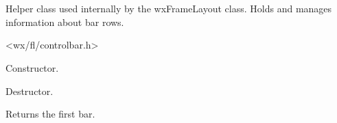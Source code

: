 %
%


\section{}\label{cbrowinfo}


Helper class used internally by the wxFrameLayout class.
Holds and manages information about bar rows.




<wx/fl/controlbar.h>




\label{cbrowinfocbrowinfo}


Constructor.


\label{cbrowinfodtor}


Destructor.


\label{cbrowinfogetfirstbar}


Returns the first bar.


